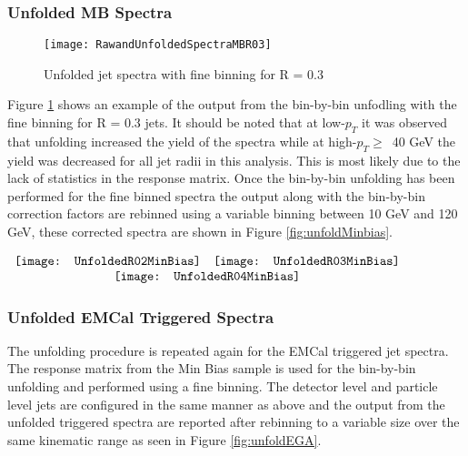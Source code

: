 \subsubsection{Unfolded MB Spectra}

\begin{figure}[h]
\texttt{[image: RawandUnfoldedSpectraMBR03]}
\centering
\caption{Unfolded jet spectra with fine binning for R = 0.3}
\label{fig:Unfoldfine}
\end{figure}

Figure \ref{fig:Unfoldfine} shows an example of the output from the bin-by-bin unfodling with the fine binning for R = 0.3 jets.  It should be noted that at low-$p_{T}$ it was observed that unfolding increased the yield of the spectra while at high-$p_{T} \geq \,$ 40 GeV the yield was decreased for all jet radii in this analysis.  This is most likely due to the lack of statistics in the response matrix.  Once the bin-by-bin unfolding has been performed for the fine binned spectra the output along with the bin-by-bin correction factors are rebinned using a variable binning between 10 GeV and 120 GeV, these corrected spectra are shown in Figure \ref{fig:unfoldMinbias}.


\begin{figure*}[t!]
$\begin{array}{rl}
    \texttt{[image: UnfoldedR02MinBias]} &
    \texttt{[image: UnfoldedR03MinBias]}\\
    \multicolumn{2}{c}{\texttt{[image: UnfoldedR04MinBias]}}
\end{array}$
\caption[Corrected Jet Spectra to Monte Carlo level for R = 0.2, R=0.3, and R = 0.4 jets.]{\label{fig:unfoldMinbias}Unfolded Min Bias Jet Spectra with correction factors, $C_{MC}$, for R = 0.2, R=0.3, and R = 0.4 jets.}
\end{figure*}

\subsubsection{Unfolded EMCal Triggered Spectra}
The unfolding procedure is repeated again for the EMCal triggered jet spectra.  The response matrix from the Min Bias sample is used for the bin-by-bin unfolding and performed using a fine binning.  The detector level and particle level jets are configured in the same manner as above and the output from the unfolded triggered spectra are reported after rebinning to a variable size over the same kinematic range as seen in Figure \ref{fig:unfoldEGA}.

